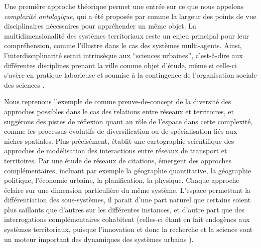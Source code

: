 \documentclass[11pt]{article}
\begin{document}
Une première approche théorique permet une entrée sur ce que nous appelons \emph{complexité ontologique}, qui a été proposée par \cite{pumain2003approche} comme la largeur des points de vue disciplinaires nécessaires pour appréhender un même objet. La multidimensionalité des systèmes territoriaux reste un enjeu principal pour leur compréhension, comme l'illustre \cite{perez2016agent} dans le cas des systèmes multi-agents. Ainsi, l'interdisciplinarité serait intrinsèque aux ``sciences urbaines'', c'est-à-dire aux différentes disciplines prenant la ville comme objet d'étude, même si celle-ci s'avère en pratique laborieuse et soumise à la contingence de l'organisation sociale des sciences \citep{dupuy2015sciences}.


Nous reprenons l'exemple de \cite{raimbault2017invisible} comme preuve-de-concept de la diversité des approches possibles dans le cas des relations entre réseaux et territoires, et suggérons des pistes de réflexion quant au rôle de l'espace dans cette complexité, comme les processus évolutifs de diversification ou de spécialisation liés aux niches spatiales. Plus précisément, \cite{raimbault2017invisible} établit une cartographie scientifique des approches de modélisation des interactions entre réseaux de transport et territoires. Par une étude de réseaux de citations, émergent des approches complémentaires, incluant par exemple la géographie quantitative, la géographie politique, l'économie urbaine, la planification, la physique. Chaque approche éclaire sur une dimension particulière du même système. L'espace permettant la différentiation des sous-systèmes, il parait d'une part naturel que certains soient plus saillants que d'autres sur les différentes instances, et d'autre part que des interrogations complémentaires cohabitent (celles-ci étant en fait endogènes aux systèmes territoriaux, puisque l'innovation et donc la recherche et la science sont un moteur important des dynamiques des systèmes urbains \citep{pumain2010theorie}).




\end{document}

